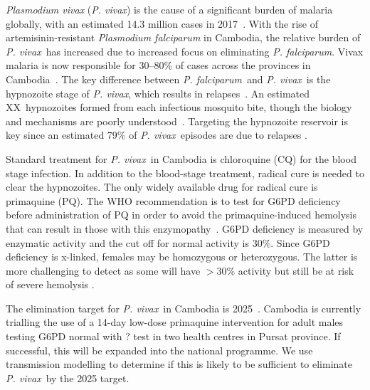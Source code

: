 \documentclass[doublespacing]{bmcart}
\newcommand{\pv}{\textit{P. vivax}}
\newcommand{\pf}{\textit{P. falciparum}}
\begin{document}
\textit{Plasmodium vivax} (\pv) is the cause of a significant burden of malaria globally, with an estimated 14.3 million cases in 2017~\cite{Battle2019}. With the rise of artemisinin-resistant \textit{Plasmodium falciparum} in Cambodia, the relative burden of \pv~has increased due to increased focus on eliminating \pf. Vivax malaria is now responsible for 30--80\% of cases across the provinces in Cambodia~\cite{Pengby, Sandfort2020}. The key difference between \pf~and \pv~is the hypnozoite stage of \pv, which results in relapses~\cite{biologyofvivax}. An estimated XX~hypnozoites formed from each infectious mosquito bite, though the biology and mechanisms are poorly understood~\cite{vivaxbiology}. Targeting the hypnozoite reservoir is key since an estimated 79\% of \pv~episodes are due to relapses \cite{Commons2020}.   

Standard treatment for \pv~in Cambodia is chloroquine (CQ) for the blood stage infection. In addition to the blood-stage treatment, radical cure is needed to clear the hypnozoites. The only widely available drug for radical cure is primaquine (PQ). The WHO recommendation is to test for G6PD deficiency before administration of PQ in order to avoid the primaquine-induced hemolysis that can result in those with this enzymopathy~\cite{WHO2015malaria}. G6PD deficiency is measured by enzymatic activity and the cut off for normal activity is 30\%. Since G6PD deficiency is x-linked, females may be homozygous or heterozygous. The latter is more challenging to detect as some will have $>$30\% activity but still be at risk of severe hemolysis \cite{Chu2017}. 

The elimination target for \pv~in Cambodia is 2025~\cite{Cambodia}. Cambodia is currently trialling the use of a 14-day low-dose primaquine intervention for adult males testing G6PD normal with ? test in two health centres in Pursat province. If successful, this will be expanded into the national programme. We use transmission modelling to determine if this is likely to be sufficient to eliminate \pv~by the 2025 target. 

%
\end{document}
